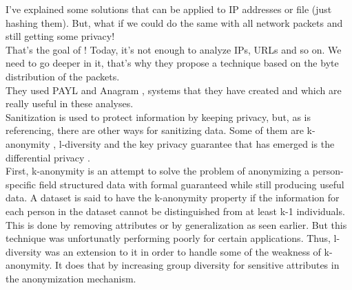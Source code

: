\documentclass{eplmastersthesis}
\begin{document}
I've explained some solutions that can be applied to IP addresses or file (just hashing them). But, what if we could do the same with all network packets and still getting some privacy!\\
That's the goal of \cite{parekh2006privacy} ! Today, it's not enough to analyze IPs, URLs and so on. We need to go deeper in it, that's why they propose a technique based on the byte distribution of the packets.\\
They used PAYL and Anagram \cite{wang2006network}, systems that they have created and which are really useful in these analyses.\\

Sanitization is used to protect information by keeping privacy, but, as \cite{mohaisen2017rethinking} is referencing, there are other ways for sanitizing data. Some of them are k-anonymity \cite{sweeney2002k}, l-diversity \cite{machanavajjhala2007diversity} and the key privacy guarantee that has emerged is the differential privacy \cite{dwork2008differential}.\\
First, k-anonymity is an attempt to solve the problem of anonymizing a person-specific field structured data with formal guaranteed while still producing useful data. A dataset is said to have the k-anonymity property if the information for each person in the dataset cannot be distinguished from at least k-1 individuals. This is done by removing attributes or by generalization as seen earlier. But this technique was unfortunatly performing poorly for certain applications. Thus, l-diversity was an extension to it in order to handle some of the weakness of k-anonymity. It does that by increasing group diversity for sensitive attributes in the anonymization mechanism.
\end{document}

